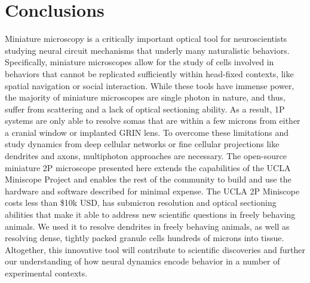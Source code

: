\documentclass [PhD] {UCLAthesis}
\begin{document}
\section{Conclusions}
Miniature microscopy is a critically important optical tool for neuroscientists studying neural circuit mechanisms that underly many naturalistic behaviors. Specifically, miniature microscopes allow for the study of cells involved in behaviors that cannot be replicated sufficiently within head-fixed contexts, like spatial navigation or social interaction. While these tools have immense power, the majority of miniature microscopes are single photon in nature, and thus, suffer from scattering and a lack of optical sectioning ability. As a result, 1P systems are only able to resolve somas that are within a few microns from either a cranial window or implanted GRIN lens. To overcome these limitations and study dynamics from deep cellular networks or fine cellular projections like dendrites and axons, multiphoton approaches are necessary. The open-source miniature 2P microscope presented here extends the capabilities of the UCLA Miniscope Project and enables the rest of the community to build and use the hardware and software described for minimal expense. The UCLA 2P Miniscope costs less than \$10k USD, has submicron resolution and optical sectioning abilities that make it able to address new scientific questions in freely behaving animals. We used it to resolve dendrites in freely behaving animals, as well as resolving dense, tightly packed granule cells hundreds of microns into tissue. Altogether, this innovative tool will contribute to scientific discoveries and further our understanding of how neural dynamics encode behavior in a number of experimental contexts. 




\end{document}

